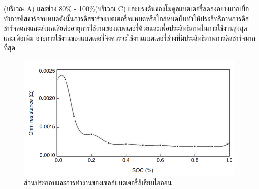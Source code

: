 (บริเวณ A) และช่วง 80\% - 100\%(บริเวณ C) และแรงดันของโมดูลแบตเตอรี่ลดลงอย่างมากเมื่อทำการดิสชาร์จจนหมดดังนั้นการดิสชาร์จแบตเตอรี่จนหมดหรือใกล้หมดนั้นทำให้ประสิทธิภาพการดิสชาร์จลดลงและส่งผลเสียต่ออายุการใช้งานของแบตเตอรี่ด้วยและเพื่อประสิทธิภาพในการใช้งานสูงสุดและเพื่อเพิ่ม
อายุการใช้งานของแบตเตอรี่จึงควรจะใช้งานแบตเตอรี่ช่วงที่มีประสิทธิภาพการดิสชาร์จมากที่สุด\newline
\begin{center}
	\begin{figure}[!h]
		\includegraphics[width=0.6\linewidth]{Chapters/img/Resistance_vs_SOC.png}
			\centering
			\captionsetup{justification=centering,margin=2cm}
			\caption{ส่วนประกอบและการทำงานของเซลล์แบตเตอรี่ลิเธียมไอออน}
	\end{figure}
\end{center}
